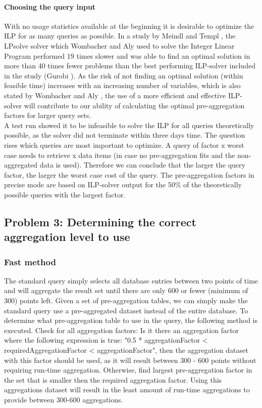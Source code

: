 \paragraph{Choosing the query input}
With no usage statistics available at the beginning it is desirable to optimize the ILP for as many queries as possible. In a study by Meindl and Templ \cite{meindl2012}, the LPsolve solver which Wombacher and Aly \cite{wombacher2011} used to solve the Integer Linear Program performed 19 times slower and was able to find an optimal solution in more than 40 times fewer problems than the best performing ILP-solver included in the study (Gurobi \cite{gurobi}). As the risk of not finding an optimal solution (within feasible time) increases with an increasing number of variables, which is also stated by Wombacher and Aly \cite{wombacher2011}, the use of a more efficient and effective ILP-solver will contribute to our ability of calculating the optimal pre-aggregation factors for larger query sets.\\

A test run showed it to be infeasible to solve the ILP for all queries theoretically possible, as the solver did not terminate within three days time. The question rises which queries are most important to optimize. A query of factor x worst case needs to retrieve x data items (in case no pre-aggregation fits and the non-aggregated data is used). Therefore we can conclude that the larger the query factor, the larger the worst case cost of the query. The pre-aggregation factors in precise mode are based on ILP-solver output for the 50\% of the theoretically possible queries with the largest factor.

\subsection{Problem 3: Determining the correct aggregation level to use}
\subsubsection{Fast method}
The standard query simply selects all database entries between two points of time and will aggregate the result set until there are only 600 or fewer (minimum of 300) points left. Given a set of pre-aggregation tables, we can simply make the standard query use a pre-aggregated dataset instead of the entire database. To determine what pre-aggregation table to use in the query, the following method is executed. Check for all aggregation factors: Is it there an aggregation factor where the following expression is true: "0.5 * aggregationFactor < requiredAggregationFactor < aggregationFactor", then the aggregation dataset with this factor should be used, as it will result between 300 - 600 points without requiring run-time aggregation. Otherwise, find largest pre-aggregation factor in the set that is smaller then the required aggregation factor. Using this aggregations dataset will result in the least amount of run-time aggregations to provide between 300-600 aggregations.\\

